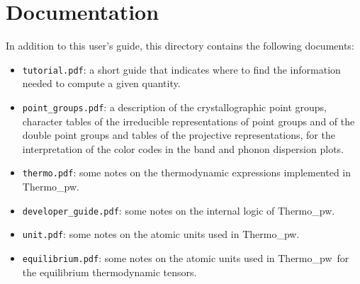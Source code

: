 \documentclass[12pt,a4paper,twoside]{report}
\def\thermo{{\sc Thermo}\_{\sc pw}}
\begin{document}
\newpage
{\color{dark-blue}\chapter{Documentation}}
\color{black}

In addition to this user's guide, this directory contains the following
documents:

\begin{itemize}

\item
\texttt{tutorial.pdf}: a short guide that indicates where to find the
information needed to compute a given quantity. 

\item
\texttt{point\_groups.pdf}: a description of the crystallographic point 
groups, character tables of the irreducible representations of point
groups and of the double point groups and tables of the projective 
representations, for the interpretation of the color codes in the band 
and phonon dispersion plots.

\item
\texttt{thermo.pdf}: some notes on the thermodynamic expressions implemented
in \thermo.

\item
\texttt{developer\_guide.pdf}: some notes on the internal logic of
\thermo.

\item
\texttt{unit.pdf}: some notes on the atomic units used in 
\thermo.

\item
\texttt{equilibrium.pdf}: some notes on the atomic units used in 
\thermo\ for the equilibrium thermodynamic tensors.

\end{itemize}
\end{document}
